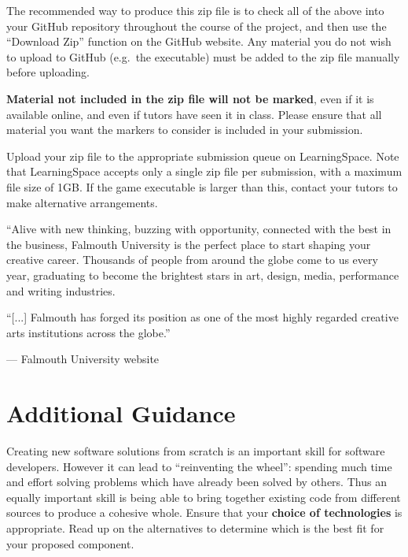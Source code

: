 \documentclass{../fal_assignment}
\begin{document}
The recommended way to produce this zip file is to check all of the above into your GitHub repository
throughout the course of the project,
and then use the ``Download Zip'' function on the GitHub website.
Any material you do not wish to upload to GitHub (e.g.\ the executable)
must be added to the zip file manually before uploading.

\textbf{Material not included in the zip file will not be marked},
even if it is available online, and even if tutors have seen it in class.
Please ensure that all material you want the markers to consider is included in your submission.

Upload your zip file to the appropriate submission queue on LearningSpace.
Note that LearningSpace accepts only a single zip file per submission,
with a maximum file size of 1GB.
If the game executable is larger than this, contact your tutors to make alternative arrangements.

\begin{marginquote}
    ``Alive with new thinking, buzzing with opportunity, connected with the best in the business,
    Falmouth University is the perfect place to start shaping your creative career.
    Thousands of people from around the globe come to us every year,
    graduating to become the brightest stars in art, design, media, performance and writing industries.

    ``[...]
    Falmouth has forged its position as one of the most highly regarded creative arts institutions across the globe.''
    
    --- Falmouth University website
\end{marginquote}
\section*{Additional Guidance}

Creating new software solutions from scratch is an important skill for software developers.
However it can lead to ``reinventing the wheel'': spending much time and effort solving problems which have already been solved by others.
Thus an equally important skill is being able to bring together existing code from different sources to produce a cohesive whole.
Ensure that your \textbf{choice of technologies} is appropriate.
Read up on the alternatives to determine which is the best fit for your proposed component.
\end{document}
